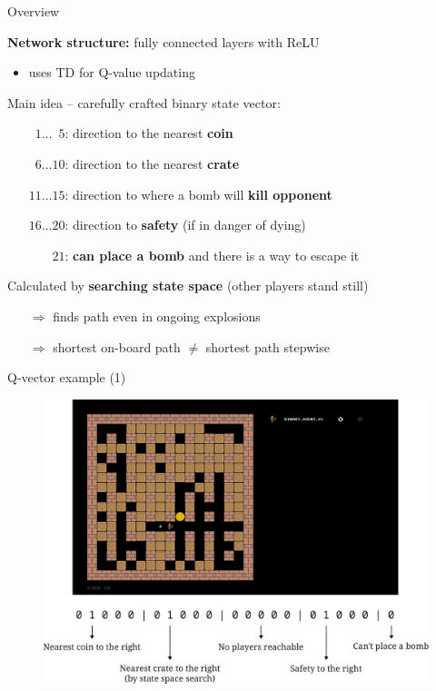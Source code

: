\documentclass{beamer}
\begin{document}
\begin{frame}{Overview}
	\pause

	\textbf{Network structure:} fully connected layers with ReLU
	\begin{itemize}
		\item uses TD for Q-value updating
	\end{itemize}

	\vspace{1.2em}
	\pause

	Main idea -- carefully crafted binary state vector:
	\begin{itemize}
		\item[]\hspace{-1.8em} $\phantom{0}1 \ldots \phantom{0}5$: direction to the nearest \textbf{coin}
		\item[]\hspace{-1.8em} $\phantom{0}6 \ldots 10$: direction to the nearest \textbf{crate}
		\item[]\hspace{-1.8em} $11 \ldots 15$: direction to where a bomb will \textbf{kill opponent}
		\item[]\hspace{-1.8em} $16 \ldots 20$: direction to \textbf{safety} (if in danger of dying)
		\item[]\hspace{-1.8em} $\phantom{06 \ldots {}}21$: \textbf{can place a bomb} and there is a way to escape it
	\end{itemize}

	\vspace{1.2em}
	\pause

	Calculated by \textbf{searching state space} (other players stand still)
	\begin{itemize}
		\item[$\Rightarrow$] finds path even in ongoing explosions
		\item[$\Rightarrow$] shortest on-board path \(\neq\) shortest path stepwise
	\end{itemize}
\end{frame}

\begin{frame}{Q-vector example (1)}
	\pause
	\begin{figure}[t]
			\centering
			\includegraphics[width=.8\linewidth]{q-vector.pdf}
	\end{figure}
\end{frame}
\end{document}
